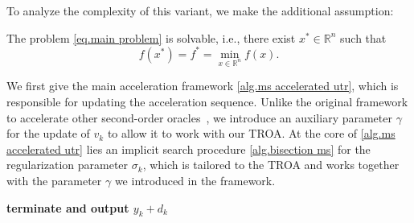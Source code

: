 \documentclass{article}
\begin{document}
To analyze the complexity of this variant, we make the additional assumption:
\begin{assumption}
    \label{assm.solvable}
    The problem \eqref{eq.main problem} is solvable, i.e., there exist $x^*\in \mathbb{R}^n$ such that 
    \begin{equation*}
        f(x^*) = f^* = \min_{x\in\mathbb{R}^n} f(x).
    \end{equation*}
\end{assumption}

We first give the main acceleration framework \autoref{alg.ms accelerated utr}, which is responsible for updating the acceleration sequence. Unlike the original framework to accelerate other second-order oracles~\cite{monteiro2013accelerated}, we introduce an auxiliary parameter $\gamma$ for the update of $v_k$ to allow it to work with our TROA. At the core of \autoref{alg.ms accelerated utr} lies an implicit search procedure \autoref{alg.bisection ms} for the regularization parameter $\sigma_k$, which is tailored to the TROA and works together with the parameter $\gamma$ we introduced in the framework.
\begin{algorithm}[ht]
    \caption{Accelerated Trust-Region Method via MS Framework(ATR\_MS)}\label{alg.ms accelerated utr}
    \begin{algorithmic}[1]
        \STATE \textbf{terminate and output $y_k+d_k$
        \label{line.early terminate ms}
        }
        \ENDIF
        \ENDFOR
    \end{algorithmic}
\end{algorithm}
\end{document}
